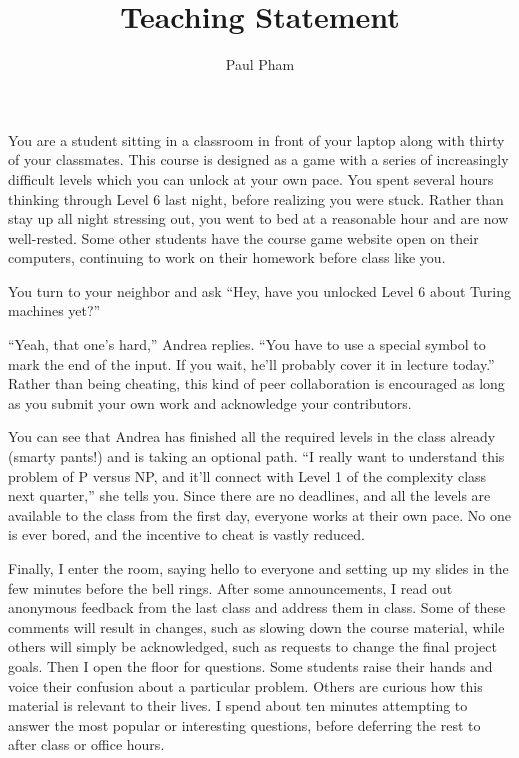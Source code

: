 \documentclass{article}
\title{Teaching Statement} \author{Paul Pham}
\begin{document}
\maketitle

You are a student sitting in a classroom in front
of your laptop along with thirty
of your classmates. This course is designed as a game with a series of
increasingly difficult levels which you can
unlock at your own pace.
You spent several hours thinking
through Level 6 last night, before realizing you were stuck.
Rather than stay up all night stressing out,
you went to bed at a reasonable hour and are now well-rested. Some
other students have the course game website open on their computers, continuing
to work on their homework before class like you.

You turn to your neighbor and ask
``Hey, have you unlocked Level 6 about Turing machines yet?''

``Yeah, that one’s hard,” Andrea replies.
``You have to use a special symbol to mark the
end of the input. If you wait, he’ll probably cover it in lecture
today.'' Rather than
being cheating, this kind of peer collaboration is encouraged as
long as you submit your own work and acknowledge your contributors.

You can see that Andrea has finished all the required levels in the
class already (smarty pants!) and is taking an optional path.
``I really want to understand this
problem of P versus NP, and it'll connect with Level 1 of the complexity
class next quarter,'' she tells you.
Since there are no
deadlines, and all the levels are available to the class from the first
day, everyone works at their own pace. No one is ever bored, and the
incentive to cheat is vastly reduced.

Finally, I enter the room, saying hello to everyone and setting up my slides
in the few minutes before the bell rings. After some announcements, I read
out anonymous feedback from the last class and address them in class. Some of
these comments will result in changes, such as slowing down the course material,
while others will simply be acknowledged, such as requests to change the
final project goals. Then I open the floor for questions.
Some students raise their
hands and voice their confusion about a particular problem. Others are
curious how this material is relevant to their lives. I spend
about ten minutes attempting to answer the most popular or interesting questions,
before deferring the rest to after class or office
hours.
\end{document}
